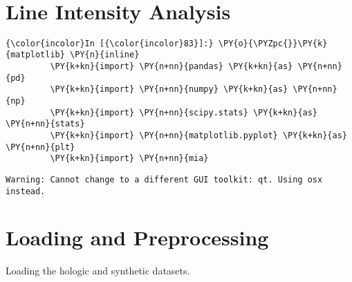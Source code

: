    \begin{center}
    \end{center}
    { \hspace*{\fill} \\}


\section*{Line Intensity Analysis}




    \begin{Verbatim}[commandchars=\\\{\}]
{\color{incolor}In [{\color{incolor}83}]:} \PY{o}{\PYZpc{}}\PY{k}{matplotlib} \PY{n}{inline}
         \PY{k+kn}{import} \PY{n+nn}{pandas} \PY{k+kn}{as} \PY{n+nn}{pd}
         \PY{k+kn}{import} \PY{n+nn}{numpy} \PY{k+kn}{as} \PY{n+nn}{np}
         \PY{k+kn}{import} \PY{n+nn}{scipy.stats} \PY{k+kn}{as} \PY{n+nn}{stats}
         \PY{k+kn}{import} \PY{n+nn}{matplotlib.pyplot} \PY{k+kn}{as} \PY{n+nn}{plt}
         \PY{k+kn}{import} \PY{n+nn}{mia}
\end{Verbatim}

    \begin{Verbatim}[commandchars=\\\{\}]
Warning: Cannot change to a different GUI toolkit: qt. Using osx instead.
    \end{Verbatim}

    \section{Loading and Preprocessing}\label{loading-and-preprocessing}

    Loading the hologic and synthetic datasets.

